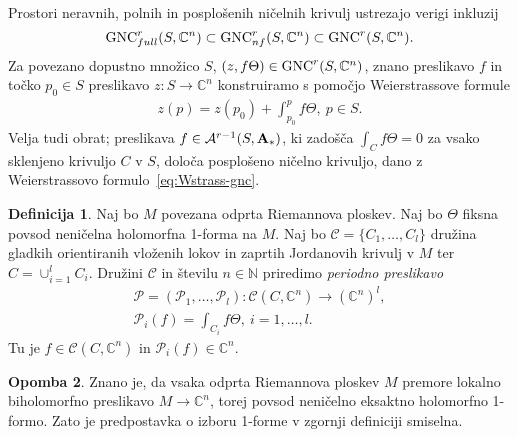\documentclass[12pt,a4paper,twoside]{article}
\theoremstyle{definition} %
\newtheorem{definicija}{Definicija}[section]
\newtheorem{opomba}[definicija]{Opomba}
\theoremstyle{plain} %
\numberwithin{equation}{section}  %
\newcommand{\N}{\mathbb N}
\newcommand{\C}{\mathbb C}
\begin{document}
Prostori neravnih, polnih in posplošenih ničelnih krivulj ustrezajo verigi inkluzij
\[ \textup{GNC}_{full}^{r}(S, \C^{n}) \subset \textup{GNC}_{nf}^{r}(S, \C^{n}) \subset \textup{GNC}^{r}(S, \C^{n}). \]
Za povezano dopustno množico $S$, $(z, f \Theta) \in \textup{GNC}^{r}(S, \C^{n})$, znano preslikavo $f$ in točko $p_{0} \in S$ preslikavo $z \colon S \to \C^{n}$ konstruiramo s pomočjo Weierstrassove formule
\begin{align} \label{eq:Wstrass-gnc}
z(p) = z(p_{0}) + \int_{p_0}^{p} f \Theta, \ p \in S.
\end{align} 
Velja tudi obrat; preslikava $f \in \mathcal{A}^{r-1}(S, \textbf{\textup{A}}_{*})$, ki zadošča $\int_{C} f \Theta = 0$ za vsako sklenjeno krivuljo $C$ v $S$, določa posplošeno ničelno krivuljo, dano z Weierstrassovo formulo~\ref{eq:Wstrass-gnc}.

\begin{definicija}
Naj bo $M$ povezana odprta Riemannova ploskev. Naj bo $\Theta$ fiksna povsod neničelna holomorfna 1-forma na $M$. Naj bo $\mathcal{C} = \{C_1, \dots , C_{l} \}$ družina gladkih orientiranih vloženih lokov in zaprtih Jordanovih krivulj v $M$ ter $C = \cup_{i=1}^{l} C_{i}$.
Družini $\mathcal{C}$ in številu $n \in \N$ priredimo \emph{periodno preslikavo}
\begin{align}
\mathcal{P} = (\mathcal{P}_1, \dots , \mathcal{P}_{l}) \colon \mathcal{C}(C, \C^{n}) \to (\C^{n})^{l}, \nonumber \\
\mathcal{P}_{i}(f) = \int_{C_{i}} f \Theta, \ i=1, \dots , l.
\end{align}
Tu je $f \in \mathcal{C}(C, \C^{n})$ in $\mathcal{P}_{i}(f) \in \C^{n}$.
\end{definicija}

\begin{opomba}
Znano je, da vsaka odprta Riemannova ploskev $M$ premore lokalno biholomorfno preslikavo $M \to \C^{n}$, torej povsod neničelno eksaktno holomorfno 1-formo. Zato je predpostavka o izboru 1-forme v zgornji definiciji smiselna.
\end{opomba}
\end{document}
